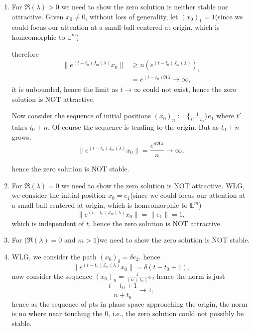 \documentclass{tufte-handout}
\newcommand\n[1]{\lVert#1\rVert}
\begin{document}
\begin{formalproof}
\begin{enumerate}[label=\textbf{Case \Roman*:},leftmargin=1.3cm]
	\item For $\Re(\lambda)>0$ we need to show the zero solution is neither stable nor attractive.
	Given $x_0 \neq 0$, without loss of generality, let $(x_0)_1 =1 $(since we could focus our attention at a small ball centered at origin, which is homeomorphic to $\mathbb{E}^m$)
	
	therefore 
	\begin{align*}
		\n{e^{(t-t_0)J_m(\lambda)} x_0} &\geq n{(e^{(t-t_0)J_m(\lambda)})_1}  \\
		& = e^{(t-t_0)\Re{\lambda}} \to \infty,
	\end{align*}
	it is unbounded, hence the limit as $t\to \infty$ could not exist, hence the zero solution is NOT attractive.
	
	Now consider the sequence of initial positions ${(x_0)_n} :=\{ \frac{1}{t'-t_0} \}e_1 $ where $t'$ takes $t_0+n$. Of course the sequence is tending to the origin. But as $t_0+n$ grows, \[ \n{e^{(t-t_0)J_m(\lambda)} x_0} = \frac{e^{n\Re{\lambda}}}{n} \to \infty, \]
	
	hence the zero solution is NOT stable.
	
	\item For $\Re(\lambda)=0$ we need to show the zero solution is NOT attractive. WLG, we consider the initial position $x_0=e_1$(since we could focus our attention at a small ball centered at origin, which is homeomorphic to $\mathbb{E}^m$)
	\[ \n{e^{(t-t_0)J_m(\lambda)} x_0} =  \n{e_1}=1, \]
	which is independent of $t$, hence the zero solution is NOT attractive.
	\item For ($\Re(\lambda)=0$ and $m>1$)we need to show the zero solution is NOT stable.
	\item WLG, we consider the path $(x_0)_\delta = \delta e_2$. hence  \[ \n{e^{(t-t_0)J_m(\lambda)} x_0} =  \delta (t-t_0 + 1), \]
    now consider the sequence $(x_0)_{n}= \frac{1}{(n+t_0)} e_2$ hence the norm is just \[  \frac{t-t_0+1}{n+t_0} \to 1, \]
    hence as the sequence of pts in phase space approaching the origin, the norm is no where near touching the 0, i.e., the zero solution could not possibly be stable.
\end{enumerate}

 \end{formalproof}
\end{document}
